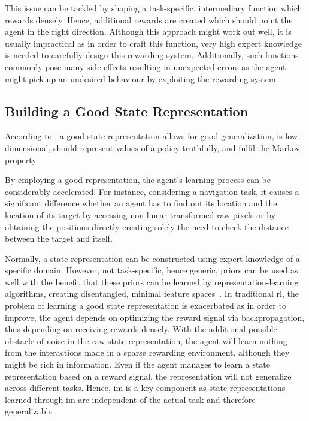 \documentclass[draft,final]{vutinfth} %
\begin{document}
    This issue can be tackled by shaping a task-specific, intermediary function which rewards densely.
    Hence, additional rewards are created which should point the agent in the right direction.
    Although this approach might work out well, it is usually impractical as in order to craft this function, very high expert knowledge is needed to carefully design this rewarding system.
    Additionally, such functions commonly pose many side effects resulting in unexpected errors as the agent might pick up an undesired behaviour by exploiting the rewarding system.

    \subsection{Building a Good State Representation}\label{subsec:building-a-good-state-representation}

    According to \citeauthor{bohmer_autonomous_2015}, a good state representation allows for good generalization, is low-dimensional, should represent values of a policy truthfully, and fulfil the Markov property.

    By employing a good representation, the agent's learning process can be considerably accelerated.
    For instance, considering a navigation task, it causes a significant difference whether an agent has to find out its location and the location of its target by accessing non-linear transformed raw pixels or by obtaining the positions directly creating solely the need to check the distance between the target and itself.

    Normally, a state representation can be constructed using expert knowledge of a specific domain.
    However, not task-specific, hence generic, priors can be used as well with the benefit that these priors can be learned by representation-learning algorithms, creating disentangled, minimal feature spaces~\citep{bengio_representation_2014}.
    In traditional \gls{rl}, the problem of learning a good state representation is exacerbated as in order to improve, the agent depends on optimizing the reward signal via backpropagation, thus depending on receiving rewards densely.
    With the additional possible obstacle of noise in the raw state representation, the agent will learn nothing from the interactions made in a sparse rewarding environment, although they might be rich in information.
    Even if the agent manages to learn a state representation based on a reward signal, the representation will not generalize across different tasks.
    Hence, \gls{im} is a key component as state representations learned through \gls{im} are independent of the actual task and therefore generalizable~\citep{aubret_survey_2019}.
\end{document}
